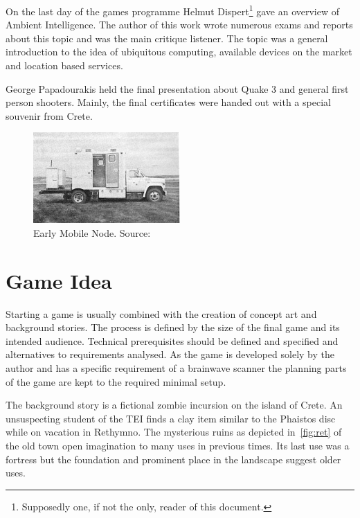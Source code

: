 \documentclass[bibtotocnumbered, headsepline,normalheadings,12pt]{report}
\begin{document}
On the last day of the games programme Helmut Dispert\footnote{Supposedly one, if not the only, reader of this document.} gave an overview of 
Ambient Intelligence. The author of this work wrote numerous exams and reports about this topic and was the main  critique listener.  
The topic was a general introduction to the idea of ubiquitous computing, available devices on the market and location based services.

George Papadourakis held the final presentation about Quake 3 and general first person shooters. Mainly, the final certificates were handed out 
with a special souvenir from Crete.

\begin{figure}[H]
    \centering
    \includegraphics[width=0.5\textwidth]{earlynode.png}%
    \caption{Early Mobile Node. Source:~\cite{Chong}}
    \label{fig:node}%
\end{figure}


\chapter{Game Idea}
\label{chap:idea}

Starting a game is usually combined with the creation of concept art and background stories. The process is defined by the size of 
the final game and its intended audience. Technical prerequisites should be defined and specified and alternatives to requirements 
analysed.
As the game is developed solely by the author and has a specific requirement of a brainwave scanner the planning parts of the 
game are kept to the required minimal setup.

The background story is a fictional zombie incursion on the island of Crete. An unsuspecting student of the TEI finds a clay item
similar to the Phaistos disc while on vacation in Rethymno. The mysterious ruins as depicted in~\ref{fig:ret} of the old town open imagination to many uses
in previous times. Its last use was a fortress but the foundation and prominent place in the landscape suggest older uses.
\end{document}
